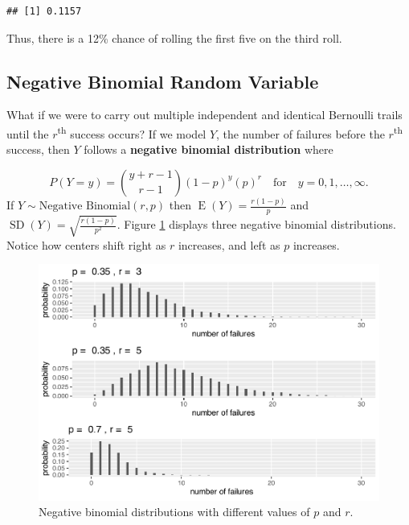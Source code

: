 \documentclass[
]{krantz}
\newcommand{\E}{\operatorname{E}}
\newcommand{\SD}{\operatorname{SD}}
\begin{document}
\begin{verbatim}
## [1] 0.1157
\end{verbatim}

Thus, there is a 12\% chance of rolling the first five on the third roll.

\hypertarget{negative-binomial-random-variable}{%
\subsection{Negative Binomial Random Variable}\label{negative-binomial-random-variable}}

What if we were to carry out multiple independent and identical Bernoulli trails until the \(r\)\textsuperscript{th} success occurs?
If we model \(Y\), the number of failures before the \(r\)\textsuperscript{th} success, then \(Y\) follows a \textbf{negative binomial distribution}  where

\begin{equation}
P(Y=y) = \binom{y + r - 1}{r-1} (1-p)^{y}(p)^r \quad \textrm{for}\quad y = 0, 1, \ldots, \infty.
\label{eq:nBinomRV}
\end{equation}
If \(Y \sim \textrm{Negative Binomial}(r, p)\) then \(\E(Y) = \frac{r(1-p)}{p}\) and \(\SD(Y) = \sqrt{\frac{r(1-p)}{p^2}}\). Figure \ref{fig:multNBinom} displays three negative binomial distributions. Notice how centers shift right as \(r\) increases, and left as \(p\) increases.



\begin{figure}

{\centering \includegraphics[width=0.6\linewidth]{bookdown-BeyondMLR_files/figure-latex/multNBinom-1} 

}

\caption{Negative binomial distributions with different values of \(p\) and \(r\).}\label{fig:multNBinom}
\end{figure}
\end{document}
